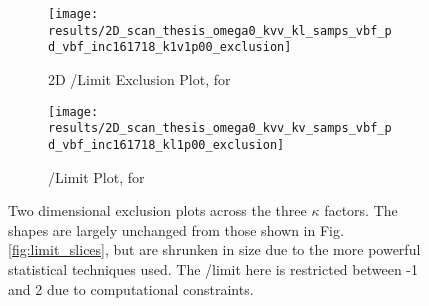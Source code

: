     \begin{figure}
        \centering
        \begin{subfigure}{0.48\textwidth} 
            \texttt{[image: results/2D\_scan\_thesis\_omega0\_kvv\_kl\_samps\_vbf\_pd\_vbf\_inc161718\_k1v1p00\_exclusion]}
            \caption{2D \kvv/\kl Limit Exclusion Plot, for }
            \label{fig:limit_slice_kv_1p0_rooFit}
        \end{subfigure}
        \begin{subfigure}{0.48\textwidth}
            \texttt{[image: results/2D\_scan\_thesis\_omega0\_kvv\_kv\_samps\_vbf\_pd\_vbf\_inc161718\_kl1p00\_exclusion]}
            \caption{\kvv/\kv Limit Plot, for }
            \label{fig:limit_slice_kl_1p0_rooFit}
        \end{subfigure}
        \caption{
            Two dimensional exclusion plots across the three $\kappa$ factors.
            The shapes are largely unchanged from those shown in Fig. \ref{fig:limit_slices},
                but are shrunken in size due to the more powerful statistical techniques used.
            The \kvv/\kv limit here is restricted between -1 and 2 due to computational constraints.
        }
    \end{figure}

